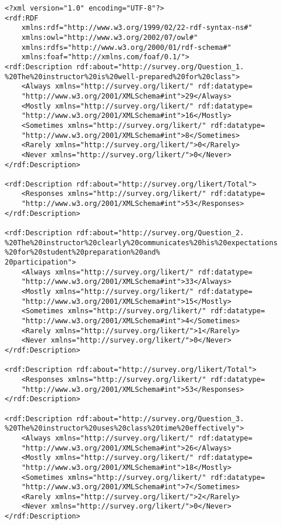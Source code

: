 \begin{lstlisting}
<?xml version="1.0" encoding="UTF-8"?>
<rdf:RDF
	xmlns:rdf="http://www.w3.org/1999/02/22-rdf-syntax-ns#"
	xmlns:owl="http://www.w3.org/2002/07/owl#"
	xmlns:rdfs="http://www.w3.org/2000/01/rdf-schema#"
	xmlns:foaf="http://xmlns.com/foaf/0.1/">
<rdf:Description rdf:about="http://survey.org/Question_1.
%20The%20instructor%20is%20well-prepared%20for%20class">
	<Always xmlns="http://survey.org/likert/" rdf:datatype=
	"http://www.w3.org/2001/XMLSchema#int">29</Always>
	<Mostly xmlns="http://survey.org/likert/" rdf:datatype=
	"http://www.w3.org/2001/XMLSchema#int">16</Mostly>
	<Sometimes xmlns="http://survey.org/likert/" rdf:datatype=
	"http://www.w3.org/2001/XMLSchema#int">8</Sometimes>
	<Rarely xmlns="http://survey.org/likert/">0</Rarely>
	<Never xmlns="http://survey.org/likert/">0</Never>
</rdf:Description>

<rdf:Description rdf:about="http://survey.org/likert/Total">
	<Responses xmlns="http://survey.org/likert/" rdf:datatype=
	"http://www.w3.org/2001/XMLSchema#int">53</Responses>
</rdf:Description>

<rdf:Description rdf:about="http://survey.org/Question_2.
%20The%20instructor%20clearly%20communicates%20his%20expectations
%20for%20student%20preparation%20and%
20participation">
	<Always xmlns="http://survey.org/likert/" rdf:datatype=
	"http://www.w3.org/2001/XMLSchema#int">33</Always>
	<Mostly xmlns="http://survey.org/likert/" rdf:datatype=
	"http://www.w3.org/2001/XMLSchema#int">15</Mostly>
	<Sometimes xmlns="http://survey.org/likert/" rdf:datatype=
	"http://www.w3.org/2001/XMLSchema#int">4</Sometimes>
	<Rarely xmlns="http://survey.org/likert/">1</Rarely>
	<Never xmlns="http://survey.org/likert/">0</Never>
</rdf:Description>

<rdf:Description rdf:about="http://survey.org/likert/Total">
	<Responses xmlns="http://survey.org/likert/" rdf:datatype=
	"http://www.w3.org/2001/XMLSchema#int">53</Responses>
</rdf:Description>

<rdf:Description rdf:about="http://survey.org/Question_3.
%20The%20instructor%20uses%20class%20time%20effectively">
	<Always xmlns="http://survey.org/likert/" rdf:datatype=
	"http://www.w3.org/2001/XMLSchema#int">26</Always>
	<Mostly xmlns="http://survey.org/likert/" rdf:datatype=
	"http://www.w3.org/2001/XMLSchema#int">18</Mostly>
	<Sometimes xmlns="http://survey.org/likert/" rdf:datatype=
	"http://www.w3.org/2001/XMLSchema#int">7</Sometimes>
	<Rarely xmlns="http://survey.org/likert/">2</Rarely>
	<Never xmlns="http://survey.org/likert/">0</Never>
</rdf:Description>


\end{lstlisting}
